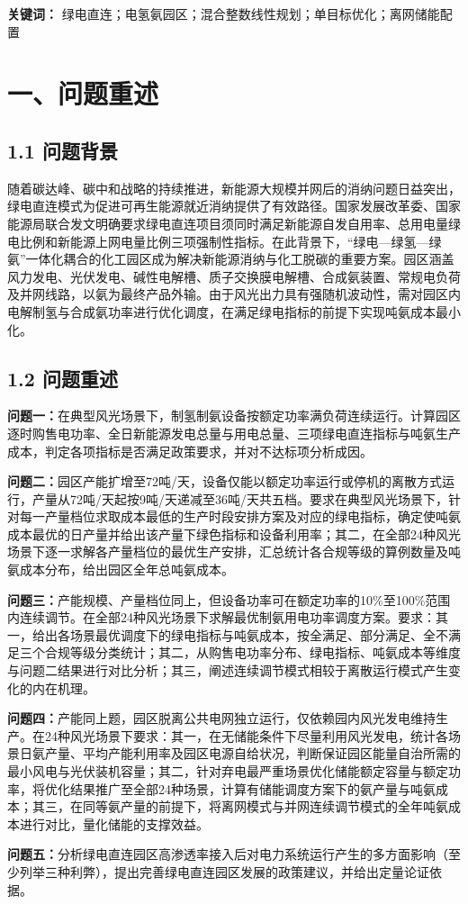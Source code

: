 \documentclass[zihao=-4,a4paper]{ctexart} %
\begin{document}
	\noindent \textbf{关键词：} 绿电直连；电氢氨园区；混合整数线性规划；单目标优化；离网储能配置
	
	\newpage
	
	
	\section*{一、问题重述}
	\subsection*{1.1 问题背景}
	
	随着碳达峰、碳中和战略的持续推进，新能源大规模并网后的消纳问题日益突出，绿电直连模式为促进可再生能源就近消纳提供了有效路径。国家发展改革委、国家能源局联合发文明确要求绿电直连项目须同时满足新能源自发自用率、总用电量绿电比例和新能源上网电量比例三项强制性指标。在此背景下，“绿电—绿氢—绿氨”一体化耦合的化工园区成为解决新能源消纳与化工脱碳的重要方案。园区涵盖风力发电、光伏发电、碱性电解槽、质子交换膜电解槽、合成氨装置、常规电负荷及并网线路，以氨为最终产品外输。由于风光出力具有强随机波动性，需对园区内电解制氢与合成氨功率进行优化调度，在满足绿电指标的前提下实现吨氨成本最小化。
	
	\subsection*{1.2 问题重述}
	\textbf{问题一：}在典型风光场景下，制氢制氨设备按额定功率满负荷连续运行。计算园区逐时购售电功率、全日新能源发电总量与用电总量、三项绿电直连指标与吨氨生产成本，判定各项指标是否满足政策要求，并对不达标项分析成因。\par
	\textbf{问题二：}园区产能扩增至72吨/天，设备仅能以额定功率运行或停机的离散方式运行，产量从72吨/天起按9吨/天递减至36吨/天共五档。要求在典型风光场景下，针对每一产量档位求取成本最低的生产时段安排方案及对应的绿电指标，确定使吨氨成本最优的日产量并给出该产量下绿色指标和设备利用率；其二，在全部24种风光场景下逐一求解各产量档位的最优生产安排，汇总统计各合规等级的算例数量及吨氨成本分布，给出园区全年总吨氨成本。\par
	\textbf{问题三：}产能规模、产量档位同上，但设备功率可在额定功率的10\%至100\%范围内连续调节。在全部24种风光场景下求解最优制氨用电功率调度方案。要求：其一，给出各场景最优调度下的绿电指标与吨氨成本，按全满足、部分满足、全不满足三个合规等级分类统计；其二，从购售电功率分布、绿电指标、吨氨成本等维度与问题二结果进行对比分析；其三，阐述连续调节模式相较于离散运行模式产生变化的内在机理。\par
	\textbf{问题四：}产能同上题，园区脱离公共电网独立运行，仅依赖园内风光发电维持生产。在24种风光场景下要求：其一，在无储能条件下尽量利用风光发电，统计各场景日氨产量、平均产能利用率及园区电源自给状况，判断保证园区能量自治所需的最小风电与光伏装机容量；其二，针对弃电最严重场景优化储能额定容量与额定功率，将优化结果推广至全部24种场景，计算有储能调度方案下的氨产量与吨氨成本；其三，在同等氨产量的前提下，将离网模式与并网连续调节模式的全年吨氨成本进行对比，量化储能的支撑效益。\par
	\textbf{问题五：}分析绿电直连园区高渗透率接入后对电力系统运行产生的多方面影响（至少列举三种利弊），提出完善绿电直连园区发展的政策建议，并给出定量论证依据。
	
\end{document}
